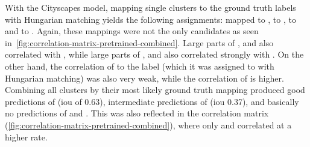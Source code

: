 With the Cityscapes model, mapping single clusters to the ground truth labels with Hungarian matching yields the following assignments:  mapped to ,  to ,  to  and  to .
Again, these mappings were not the only candidates as seen in~\autoref{fig:correlation-matrix-pretrained-combined}.
Large parts of , and  also correlated with , while large parts of , and  also correlated strongly with .
On the other hand, the correlation of  to the  label (which it was assigned to with Hungarian matching) was also very weak, while the correlation of  is higher.
Combining all clusters by their most likely ground truth mapping produced good predictions of  (\gls{iou} of 0.63), intermediate predictions of  (\gls{iou} 0.37), and basically no predictions of  and .
This was also reflected in the correlation matrix (\autoref{fig:correlation-matrix-pretrained-combined}), where only  and  correlated at a higher rate.


